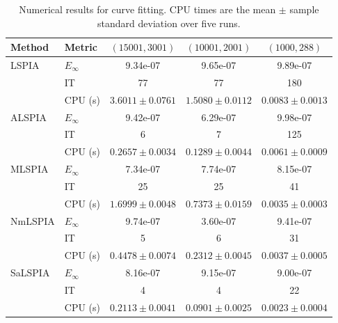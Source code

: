 \begin{table}[t]
\centering
\caption{Numerical results for curve fitting. CPU times are the mean $\pm$ sample standard deviation over five runs.}
\label{tab:curve_results_cpu_sd}
\begin{tabular}{llccc}
\hline
Method & Metric & $(15001,3001)$ & $(10001,2001)$ & $(1000,288)$ \\
\hline
LSPIA & $E_\infty$ & 9.34e-07 & 9.65e-07 & 9.89e-07 \\
 & IT & 77 & 77 & 180 \\
 & CPU (s) & $3.6011 \pm 0.0761$ & $1.5080 \pm 0.0112$ & $0.0083 \pm 0.0013$ \\
ALSPIA & $E_\infty$ & 9.42e-07 & 6.29e-07 & 9.98e-07 \\
 & IT & 6 & 7 & 125 \\
 & CPU (s) & $0.2657 \pm 0.0034$ & $0.1289 \pm 0.0044$ & $0.0061 \pm 0.0009$ \\
MLSPIA & $E_\infty$ & 7.34e-07 & 7.74e-07 & 8.15e-07 \\
 & IT & 25 & 25 & 41 \\
 & CPU (s) & $1.6999 \pm 0.0048$ & $0.7373 \pm 0.0159$ & $0.0035 \pm 0.0003$ \\
NmLSPIA & $E_\infty$ & 9.74e-07 & 3.60e-07 & 9.41e-07 \\
 & IT & 5 & 6 & 31 \\
 & CPU (s) & $0.4478 \pm 0.0074$ & $0.2312 \pm 0.0045$ & $0.0037 \pm 0.0005$ \\
SaLSPIA & $E_\infty$ & 8.16e-07 & 9.15e-07 & 9.00e-07 \\
 & IT & 4 & 4 & 22 \\
 & CPU (s) & $0.2113 \pm 0.0041$ & $0.0901 \pm 0.0025$ & $0.0023 \pm 0.0004$ \\
\hline
\end{tabular}
\end{table}
